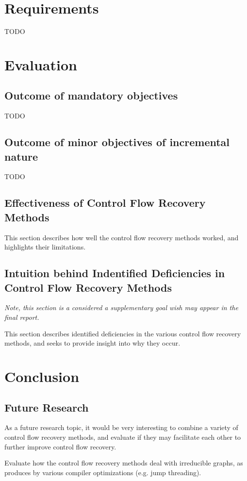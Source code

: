 \documentclass[12pt, a4paper]{article}
\begin{document}
\section{Requirements}

TODO

\section{Evaluation}

\subsection{Outcome of mandatory objectives}

TODO

\subsection{Outcome of minor objectives of incremental nature}

TODO

\subsection{Effectiveness of Control Flow Recovery Methods}

This section describes how well the control flow recovery methods worked, and highlights their limitations.

\subsection{Intuition behind Indentified Deficiencies in Control Flow Recovery Methods}

\textit{Note, this section is a considered a supplementary goal wish may appear in the final report.}

This section describes identified deficiencies in the various control flow recovery methods, and seeks to provide insight into why they occur.

\section{Conclusion}

\subsection{Future Research}

As a future research topic, it would be very interesting to combine a variety of control flow recovery methods, and evaluate if they may facilitate each other to further improve control flow recovery.

Evaluate how the control flow recovery methods deal with irreducible graphs, as produces by various compiler optimizations (e.g. jump threading).

\clearpage


\end{document}
